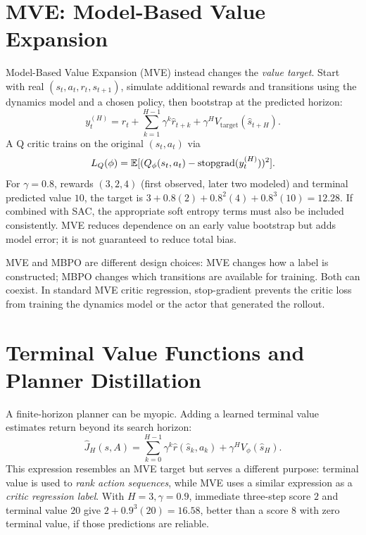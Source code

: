 \section{MVE: Model-Based Value Expansion}
Model-Based Value Expansion (MVE) instead changes the \emph{value target}. Start with real $(s_t,a_t,r_t,s_{t+1})$, simulate additional rewards and transitions using the dynamics model and a chosen policy, then bootstrap at the predicted horizon:
\begin{equation}
y_t^{(H)}=
r_t+\sum_{k=1}^{H-1}\gamma^k\hat r_{t+k}
+\gamma^HV_{\mathrm{target}}(\hat s_{t+H}).
\end{equation}
A Q critic trains on the original $(s_t,a_t)$ via
\begin{equation}
L_Q(\phi)=\mathbb{E}[(Q_\phi(s_t,a_t)-\operatorname{stopgrad}(y_t^{(H)}))^2].
\end{equation}
For $\gamma=0.8$, rewards $(3,2,4)$ (first observed, later two modeled) and terminal predicted value $10$, the target is
$3+0.8(2)+0.8^2(4)+0.8^3(10)=12.28$.
If combined with SAC, the appropriate soft entropy terms must also be included consistently. MVE reduces dependence on an early value bootstrap but adds model error; it is not guaranteed to reduce total bias.
\begin{pitfall}
MVE and MBPO are different design choices: MVE changes how a label is constructed; MBPO changes which transitions are available for training. Both can coexist. In standard MVE critic regression, stop-gradient prevents the critic loss from training the dynamics model or the actor that generated the rollout.
\end{pitfall}

\section{Terminal Value Functions and Planner Distillation}
A finite-horizon planner can be myopic. Adding a learned terminal value estimates return beyond its search horizon:
\begin{equation}
\hat J_H(s,A)=
\sum_{k=0}^{H-1}\gamma^k\hat r(\hat s_k,a_k)
+\gamma^HV_\phi(\hat s_H).
\end{equation}
This expression resembles an MVE target but serves a different purpose: terminal value is used to \emph{rank action sequences}, while MVE uses a similar expression as a \emph{critic regression label}. With $H=3,\gamma=0.9$, immediate three-step score $2$ and terminal value $20$ give $2+0.9^3(20)=16.58$, better than a score $8$ with zero terminal value, if those predictions are reliable.

